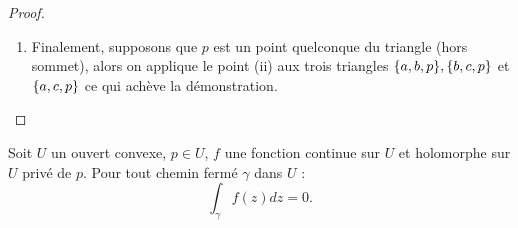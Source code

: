 \begin{proof}
\begin{enumerate}[label=(\roman*)]
\begin{center}
\end{center} 
Ces deux dernières intégrales sont nulles : les triangles ne contenant pas $p$, on leur applique le résultat (i).
Il en résulte que :
\[ \int_{\partial \Delta} f(z) d = \int_{[a,x]} f(z) dz + \int_{[x,y]} f(z) dz + \int_{[y,a]} f(z) dz , \]
Chacun de ces intervalles peut être rendu arbitrairement petit et $f$ est bornée sur chacun de ces intervalles (car continue), 
donc l'intégrale de $f$ sur le chemin $\partial \Delta$ est nulle.

\item
Finalement, supposons que $p$ est un point quelconque du triangle (hors sommet), alors on applique le point (ii) aux trois triangles
$\{ a,b,p \}, \{ b,c,p \}$ et $\{ a,c,p \}$ ce qui achève la démonstration.

\end{enumerate}
\end{proof}

\begin{thm}
\label{Cauchy:conv}
Soit $U$ un ouvert convexe, $p \in U$, $f$ une fonction continue sur $U$ et holomorphe sur $U$
privé de $p$. Pour tout chemin fermé $\gamma$ dans $U$ :
\[ \int_{\gamma} f(z) dz = 0 . \]
\end{thm}


